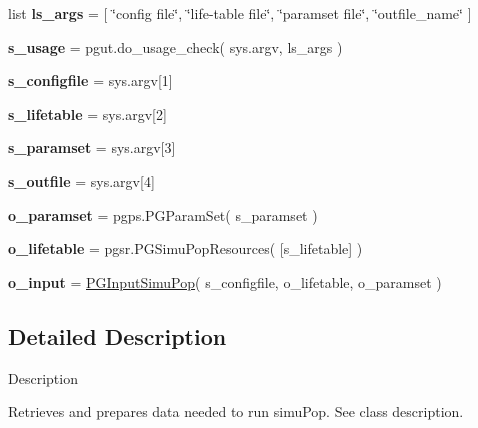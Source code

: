 \begin{DoxyCompactItemize}
\item 
list {\bfseries ls\+\_\+args} = \mbox{[} \char`\"{}config file\char`\"{}, \char`\"{}life-\/table file\char`\"{}, \char`\"{}paramset file\char`\"{}, \char`\"{}outfile\+\_\+name\char`\"{} \mbox{]}\hypertarget{namespacenegui_1_1pginputsimupop_a212871332a72d3f19da8448e4ca04a35}{}\label{namespacenegui_1_1pginputsimupop_a212871332a72d3f19da8448e4ca04a35}

\item 
{\bfseries s\+\_\+usage} = pgut.\+do\+\_\+usage\+\_\+check( sys.\+argv, ls\+\_\+args )\hypertarget{namespacenegui_1_1pginputsimupop_a4d7b2ce5d00d1602247ff5f3e204d434}{}\label{namespacenegui_1_1pginputsimupop_a4d7b2ce5d00d1602247ff5f3e204d434}

\item 
{\bfseries s\+\_\+configfile} = sys.\+argv\mbox{[}1\mbox{]}\hypertarget{namespacenegui_1_1pginputsimupop_af369b347e55b2a28d8cfcdec5f7cf37e}{}\label{namespacenegui_1_1pginputsimupop_af369b347e55b2a28d8cfcdec5f7cf37e}

\item 
{\bfseries s\+\_\+lifetable} = sys.\+argv\mbox{[}2\mbox{]}\hypertarget{namespacenegui_1_1pginputsimupop_a1c6ba95bf6bdd72ae956dd939192c5a3}{}\label{namespacenegui_1_1pginputsimupop_a1c6ba95bf6bdd72ae956dd939192c5a3}

\item 
{\bfseries s\+\_\+paramset} = sys.\+argv\mbox{[}3\mbox{]}\hypertarget{namespacenegui_1_1pginputsimupop_a5a79f3003860699f2ac660ae78b9efe5}{}\label{namespacenegui_1_1pginputsimupop_a5a79f3003860699f2ac660ae78b9efe5}

\item 
{\bfseries s\+\_\+outfile} = sys.\+argv\mbox{[}4\mbox{]}\hypertarget{namespacenegui_1_1pginputsimupop_a43dc89670d5ffaa1cfb5f3af3a910114}{}\label{namespacenegui_1_1pginputsimupop_a43dc89670d5ffaa1cfb5f3af3a910114}

\item 
{\bfseries o\+\_\+paramset} = pgps.\+P\+G\+Param\+Set( s\+\_\+paramset )\hypertarget{namespacenegui_1_1pginputsimupop_ac0b61e7e37d60e3975dabaab3bd3860a}{}\label{namespacenegui_1_1pginputsimupop_ac0b61e7e37d60e3975dabaab3bd3860a}

\item 
{\bfseries o\+\_\+lifetable} = pgsr.\+P\+G\+Simu\+Pop\+Resources( \mbox{[}s\+\_\+lifetable\mbox{]} )\hypertarget{namespacenegui_1_1pginputsimupop_a29862789f653e600c71f7e493da85fe6}{}\label{namespacenegui_1_1pginputsimupop_a29862789f653e600c71f7e493da85fe6}

\item 
{\bfseries o\+\_\+input} = \hyperlink{classnegui_1_1pginputsimupop_1_1PGInputSimuPop}{P\+G\+Input\+Simu\+Pop}( s\+\_\+configfile, o\+\_\+lifetable, o\+\_\+paramset )\hypertarget{namespacenegui_1_1pginputsimupop_ab1875160da07b1636155bb3793562c2d}{}\label{namespacenegui_1_1pginputsimupop_ab1875160da07b1636155bb3793562c2d}

\end{DoxyCompactItemize}


\subsection{Detailed Description}
\begin{DoxyVerb}Description

Retrieves and prepares data needed to run simuPop.  See class description.\end{DoxyVerb}
 
